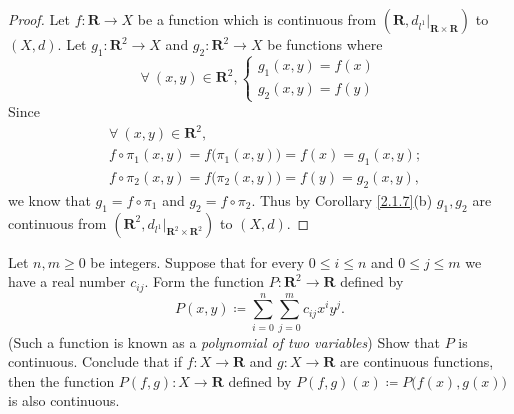 \begin{proof}
    Let \(f : \mathbf{R} \to X\) be a function which is continuous from \((\mathbf{R}, d_{l^1}|_{\mathbf{R} \times \mathbf{R}})\) to \((X, d)\).
    Let \(g_1 : \mathbf{R}^2 \to X\) and \(g_2 : \mathbf{R}^2 \to X\) be functions where
    \[
        \forall\ (x, y) \in \mathbf{R}^2, \begin{cases}
            g_1(x, y) = f(x) \\
            g_2(x, y) = f(y)
        \end{cases}
    \]
    Since
    \begin{align*}
         & \forall\ (x, y) \in \mathbf{R}^2,                                \\
         & f \circ \pi_1(x, y) = f\big(\pi_1(x, y)\big) = f(x) = g_1(x, y); \\
         & f \circ \pi_2(x, y) = f\big(\pi_2(x, y)\big) = f(y) = g_2(x, y),
    \end{align*}
    we know that \(g_1 = f \circ \pi_1\) and \(g_2 = f \circ \pi_2\).
    Thus by Corollary \ref{2.1.7}(b) \(g_1, g_2\) are continuous from \((\mathbf{R}^2, d_{l^1}|_{\mathbf{R}^2 \times \mathbf{R}^2})\) to \((X, d)\).
\end{proof}

\begin{exercise}\label{ex 2.2.5}
    Let \(n, m \geq 0\) be integers.
    Suppose that for every \(0 \leq i \leq n\) and \(0 \leq j \leq m\) we have a real number \(c_{ij}\).
    Form the function \(P : \mathbf{R}^2 \to \mathbf{R}\) defined by
    \[
        P(x, y) \coloneqq \sum_{i = 0}^n \sum_{j = 0}^m c_{ij} x^i y^j.
    \]
    (Such a function is known as a \emph{polynomial of two variables})
    Show that \(P\) is continuous.
    Conclude that if \(f : X \to \mathbf{R}\) and \(g : X \to \mathbf{R}\) are continuous functions, then the function \(P(f, g) : X \to \mathbf{R}\) defined by \(P(f, g)(x) \coloneqq P\big(f(x), g(x)\big)\) is also continuous.
\end{exercise}

